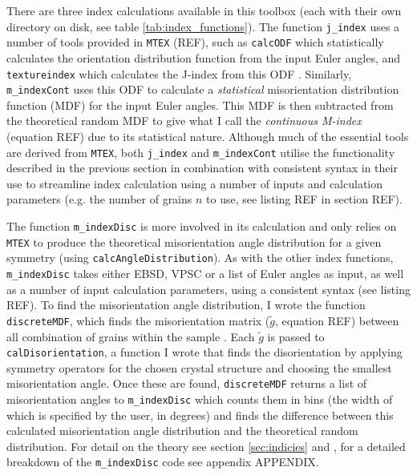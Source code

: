 \documentclass[a4paper,12pt]{report}
\numberwithin{equation}{chapter}
\begin{document}
There are three index calculations available in this toolbox (each with their own directory on disk, see table \ref{tab:index_functions}). The function \texttt{j\_{}index} uses a number of tools provided in \texttt{MTEX} (REF),  such as \texttt{calcODF} which statistically calculates the orientation distribution function from the input Euler angles, and \texttt{textureindex} which calculates the J-index from this ODF \citep[for details on their method of ODF calculation see][]{Hielscher2008}. Similarly, \texttt{m\_{}indexCont} uses this ODF to calculate a \emph{statistical} misorientation distribution function (MDF) for the input Euler angles.  This MDF is then subtracted from the theoretical random MDF to give what I call the \emph{continuous M-index} (equation REF) due to its statistical nature.  Although much of the essential tools are derived from \texttt{MTEX}, both \texttt{j\_{}index} and \texttt{m\_{}indexCont} utilise the functionality described in the previous section in combination with consistent syntax in their use to streamline index calculation using a number of inputs and calculation parameters (e.g. the number of grains $n$ to use, see listing REF in section REF).         

The function \texttt{m\_{}indexDisc} is more involved in its calculation and only relies on \texttt{MTEX} to produce the theoretical misorientation angle distribution for a given symmetry (using \texttt{calcAngleDistribution}). As with the other index functions, \texttt{m\_{}indexDisc} takes either EBSD, VPSC or a list of Euler angles as input, as well as a number of input calculation parameters, using a consistent syntax (see listing REF). To find the misorientation angle distribution, I wrote the function \texttt{discreteMDF}, which finds the misorientation matrix ($\tilde{g}$, equation REF) between all combination of grains within the sample \citep[uncorrelated misorientation angle distribution,][]{Mainprice}. Each $\tilde{g}$ is passed to \texttt{calDisorientation}, a function I wrote that finds the disorientation \citep{Grimmer1979} by applying symmetry operators for the chosen crystal structure and choosing the smallest misorientation angle. Once these are found, \texttt{discreteMDF} returns a list of misorientation angles to \texttt{m\_{}indexDisc} which counts them in bins (the width of which is specified by the user, in degrees) and finds the difference between this calculated misorientation angle distribution and the theoretical random distribution. For detail on the theory see section \ref{sec:indicies} and \cite{Skemer}, for a detailed breakdown of the \texttt{m\_{}indexDisc} code see appendix APPENDIX.                                            
\end{document}
